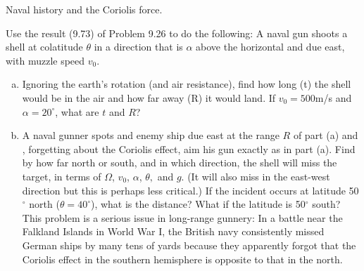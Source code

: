 \documentclass[11pt,letterpaper,boxed]{../hmcpsetrhino}
\begin{document}
\begin{problem}[iii]
Naval history and the Coriolis force.

\begin{problem}[9.28]
Use the result (9.73) of Problem 9.26 to do the following: A naval gun shoots a shell at colatitude $\theta$ in a direction that is $\alpha$ above the horizontal and due east, with muzzle speed $v_0$. 
\begin{enumerate}[(a)]
\item Ignoring the earth's rotation (and air resistance), find how long (t) the shell would be in the air and how far away (R) it would land. If $v_0 = 500$m/s and $\alpha = 20^{\circ}$, what are $t$ and $R$? 

\item A naval gunner spots and enemy ship due east at the range $R$ of part (a) and , forgetting about the Coriolis effect, aim his gun exactly as in part (a). Find by how far north or south, and in which direction, the shell will miss the target, in terms of $\Omega$, $v_0$, $\alpha$, $\theta,$ and $g$. (It will also miss in the east-west direction but this is perhaps less critical.) If the incident occurs at latitude 50$^\circ$ north ($\theta = 40^\circ$), what is the distance? What if the latitude is 50$^\circ$ south? This problem is a serious issue in long-range gunnery: In a battle near the Falkland Islands in World War I, the British navy consistently missed German ships by many tens of yards because they apparently forgot that the Coriolis effect in the southern hemisphere is opposite to that in the north.
\end{enumerate}
\end{problem}
\end{problem}
\begin{solution}


\vfill
\end{solution}
\end{document}
